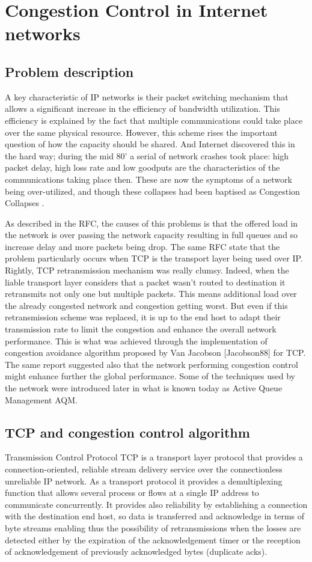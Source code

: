 \section{Congestion Control in Internet networks}
\subsection{Problem description}
A key characteristic of IP networks is their packet switching mechanism that allows a significant increase in the efficiency of bandwidth utilization. This efficiency is explained by the fact that multiple communications could take place over the same physical resource. However, this scheme rises the important question of how the capacity should be shared. And Internet discovered this in the hard way; during the mid 80' a serial of network crashes took place: high packet delay, high loss rate and  low  goodputs are the characteristics of the communications taking place then. These are now the symptoms of a network being over-utilized, and though these collapses had been baptised as Congestion Collapses \cite{RFC896}. 

As described in the RFC, the causes of this problems is that the offered load in the network is over passing the network capacity resulting in full queues and so increase delay and more packets being drop. The same RFC state that the problem particularly occurs when TCP is the transport layer being used over IP. Rightly, TCP retransmission mechanism was really clumsy. Indeed, when the liable transport layer considers that a packet wasn't routed to destination it retransmits not only one but multiple packets. This means additional load over the already congested network and congestion getting worst. But even if this retransmission scheme was replaced, it is up to the end host to adapt their transmission rate to limit the congestion and enhance the overall network performance. This is what was achieved through the implementation of congestion avoidance algorithm proposed by Van Jacobson [Jacobson88] for TCP. The same report suggested also that the network performing congestion control might enhance further the global performance. Some of the techniques used by the network were introduced later in what is known today as Active Queue Management AQM.
\subsection{TCP and congestion control algorithm}
Transmission Control Protocol TCP is a transport layer protocol that provides a connection-oriented, reliable stream delivery service over the connectionless unreliable IP network. As a transport protocol it provides a demultiplexing function that allows several process or flows at a single IP address to communicate concurrently. It provides also reliability by establishing a connection with the destination end host, so data is transferred and acknowledge in terms of byte streams enabling thus the possibility of retransmissions when the losses are detected either by the expiration of the acknowledgement timer or the reception of acknowledgement of previously acknowledged bytes (duplicate acks).

